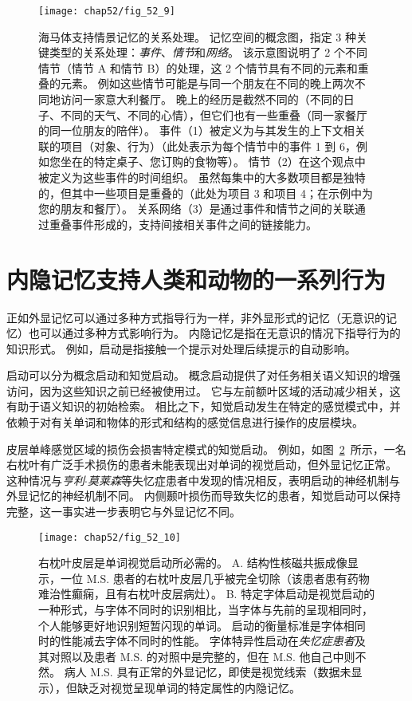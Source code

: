 \begin{figure}[htbp]
	\centering
	\texttt{[image: chap52/fig\_52\_9]}
	\caption{海马体支持情景记忆的关系处理。
		记忆空间的概念图，指定 3 种关键类型的关系处理：\textit{事件}、\textit{情节}和\textit{网络}。
		该示意图说明了 2 个不同情节（情节 A 和情节 B）的处理，这 2 个情节具有不同的元素和重叠的元素。
		例如这些情节可能是与同一个朋友在不同的晚上两次不同地访问一家意大利餐厅。
		晚上的经历是截然不同的（不同的日子、不同的天气、不同的心情），但它们也有一些重叠（同一家餐厅的同一位朋友的陪伴）。
		事件（1）被定义为与其发生的上下文相关联的项目（对象、行为）（此处表示为每个情节中的事件 1 到 6，例如您坐在的特定桌子、您订购的食物等）。
		情节（2）在这个观点中被定义为这些事件的时间组织。
		虽然每集中的大多数项目都是独特的，但其中一些项目是重叠的（此处为项目 3 和项目 4；在示例中为您的朋友和餐厅）。
		关系网络（3）是通过事件和情节之间的关联通过重叠事件形成的，支持间接相关事件之间的链接能力\cite{eichenbaum2014can}。 }
	\label{fig:52_9}
\end{figure}



\section{内隐记忆支持人类和动物的一系列行为}

正如外显记忆可以通过多种方式指导行为一样，非外显形式的记忆（无意识的记忆）也可以通过多种方式影响行为。
内隐记忆是指在无意识的情况下指导行为的知识形式。
例如，启动是指接触一个提示对处理后续提示的自动影响。


启动可以分为概念启动和知觉启动。
概念启动提供了对任务相关语义知识的增强访问，因为这些知识之前已经被使用过。
它与左前额叶区域的活动减少相关，这有助于语义知识的初始检索。
相比之下，知觉启动发生在特定的感觉模式中，并依赖于对有关单词和物体的形式和结构的感觉信息进行操作的皮层模块。


皮层单峰感觉区域的损伤会损害特定模式的知觉启动。
例如，如图~\ref{fig:52_10}~所示，一名右枕叶有广泛手术损伤的患者未能表现出对单词的视觉启动，但外显记忆正常。
这种情况与\textit{亨利$\cdot$莫莱森}等失忆症患者中发现的情况相反，表明启动的神经机制与外显记忆的神经机制不同。
内侧颞叶损伤而导致失忆的患者，知觉启动可以保持完整，这一事实进一步表明它与外显记忆不同。


\begin{figure}[htbp]
	\centering
	\texttt{[image: chap52/fig\_52\_10]}
	\caption{右枕叶皮层是单词视觉启动所必需的\cite{vaidya1998font}。
		A. 结构性核磁共振成像显示，一位 M.S. 患者的右枕叶皮层几乎被完全切除（该患者患有药物难治性癫痫，且有右枕叶皮层病灶）。
		B. 特定字体启动是视觉启动的一种形式，与字体不同时的识别相比，当字体与先前的呈现相同时，个人能够更好地识别短暂闪现的单词。
		启动的衡量标准是字体相同时的性能减去字体不同时的性能。
		字体特异性启动在\textit{失忆症患者}及其对照以及患者 M.S. 的对照中是完整的，但在 M.S. 他自己中则不然。
		病人 M.S. 具有正常的外显记忆，即使是视觉线索（数据未显示），但缺乏对视觉呈现单词的特定属性的内隐记忆。}
	\label{fig:52_10}
\end{figure}




